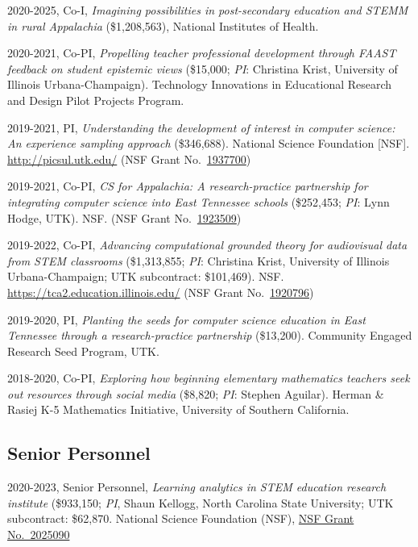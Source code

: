 \documentclass[
  14,
]{article}
\begin{document}
2020-2025, Co-I, \emph{Imagining possibilities in post-secondary
education and STEMM in rural Appalachia} (\$1,208,563), National
Institutes of Health.

2020-2021, Co-PI, \emph{Propelling teacher professional development
through FAAST feedback on student epistemic views} (\$15,000; \emph{PI}:
Christina Krist, University of Illinois Urbana-Champaign). Technology
Innovations in Educational Research and Design Pilot Projects Program.

2019-2021, PI, \emph{Understanding the development of interest in
computer science: An experience sampling approach} (\$346,688). National
Science Foundation {[}NSF{]}. \url{http://picsul.utk.edu/} (NSF Grant
No.~\href{https://www.nsf.gov/awardsearch/showAward?AWD_ID=1937700\&HistoricalAwards=false}{1937700})

2019-2021, Co-PI, \emph{CS for Appalachia: A research-practice
partnership for integrating computer science into East Tennessee
schools} (\$252,453; \emph{PI}: Lynn Hodge, UTK). NSF. (NSF Grant
No.~\href{https://www.nsf.gov/awardsearch/showAward?AWD_ID=1923509\&HistoricalAwards=false}{1923509})

2019-2022, Co-PI, \emph{Advancing computational grounded theory for
audiovisual data from STEM classrooms} (\$1,313,855; \emph{PI}:
Christina Krist, University of Illinois Urbana-Champaign; UTK
subcontract: \$101,469). NSF. \url{https://tca2.education.illinois.edu/}
(NSF Grant
No.~\href{https://www.nsf.gov/awardsearch/showAward?AWD_ID=1920796\&HistoricalAwards=false}{1920796})

2019-2020, PI, \emph{Planting the seeds for computer science education
in East Tennessee through a research-practice partnership} (\$13,200).
Community Engaged Research Seed Program, UTK.

2018-2020, Co-PI, \emph{Exploring how beginning elementary mathematics
teachers seek out resources through social media} (\$8,820; \emph{PI}:
Stephen Aguilar). Herman \& Rasiej K-5 Mathematics Initiative,
University of Southern California.

\hypertarget{senior-personnel}{%
\subsection{Senior Personnel}\label{senior-personnel}}

2020-2023, Senior Personnel, \emph{Learning analytics in STEM education
research institute} (\$933,150; \emph{PI}, Shaun Kellogg, North Carolina
State University; UTK subcontract: \$62,870. National Science Foundation
(NSF),
\href{https://www.nsf.gov/awardsearch/showAward?AWD_ID=2025090\&HistoricalAwards=false}{NSF
Grant No.~2025090}
\end{document}
